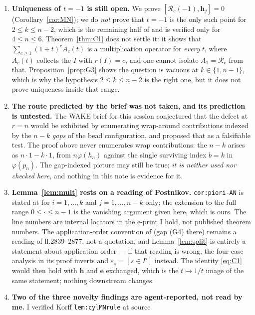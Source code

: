 \documentclass[11pt]{article}
\theoremstyle{plain}
\theoremstyle{definition}
\newcommand{\bh}{\mathbf h}
\newcommand{\be}{\mathbf e}
\begin{document}
\begin{enumerate}
\item[(H1)] \textbf{Uniqueness of $t=-1$ is still open.}  We prove
$[\mathcal R_e(-1),\bh_j]=0$ (Corollary~\ref{cor:MN}); we do \emph{not} prove
that $t=-1$ is the only such point for $2\le k\le n-2$, which is the remaining
half of \cite[\texttt{thm:B}(i)]{Clio201} and is verified only for $4\le n\le6$.
Theorem~\ref{thm:C1} does not settle it: it shows that
$\sum_{c\ge1}(1+t)^cA_c(t)$ is a multiplication operator for \emph{every} $t$,
where $A_c(t)$ collects the $I$ with $r(I)=c$, and one cannot isolate
$A_1=\mathcal R_e$ from that.  Proposition~\ref{prop:G3} shows the question is
vacuous at $k\in\{1,n-1\}$, which is why the hypothesis $2\le k\le n-2$ is the
right one, but it does not prove uniqueness inside that range.
\item[(H2)] \textbf{The route predicted by the brief was not taken, and its
prediction is untested.}  The WAKE brief for this session conjectured that the
defect at $r=n$ would be exhibited by enumerating wrap-around contributions
indexed by the $n-k$ \emph{gaps} of the bead configuration, and proposed that as
a falsifiable test.  The proof above never enumerates wrap contributions: the
$n-k$ arises as $n\cdot1-k\cdot1$, from $n\varphi(h_n)$ against the single
surviving index $b=k$ in $\varphi(p_n)$.  The gap-indexed picture may still be
true; \emph{it is neither used nor checked here}, and nothing in this note is
evidence for it.
\item[(H3)] \textbf{Lemma~\ref{lem:mult} rests on a reading of Postnikov.}
\texttt{cor:pieri-AN} is stated at \cite[ll.2935--2947]{Pos} for $i=1,\dots,k$
and $j=1,\dots,n-k$ only; the extension to the full range $0\le\cdot\le n-1$ is
the vanishing argument given here, which is ours.  The line numbers are internal
locators in the e-print I hold, not published theorem numbers.  The
application-order convention of \cite[\texttt{rem:conv}]{Clio201} (gap (G4) there)
remains a reading of ll.2839--2877, not a quotation, and Lemma~\ref{lem:split}
is entirely a statement about application order --- if that reading is wrong,
the four-case analysis in its proof inverts and $\varepsilon_s=[s\in I']$
instead.  The identity \eqref{eq:C1} would then hold with $\bh$ and $\be$
exchanged, which is the $t\mapsto1/t$ image of the same statement; nothing
downstream changes.
\item[(H4)] \textbf{Two of the three novelty findings are agent-reported, not
read by me.}  I verified Korff \cite{Korff19} \texttt{lem:cylMNrule} at source

\end{enumerate}
\end{document}
